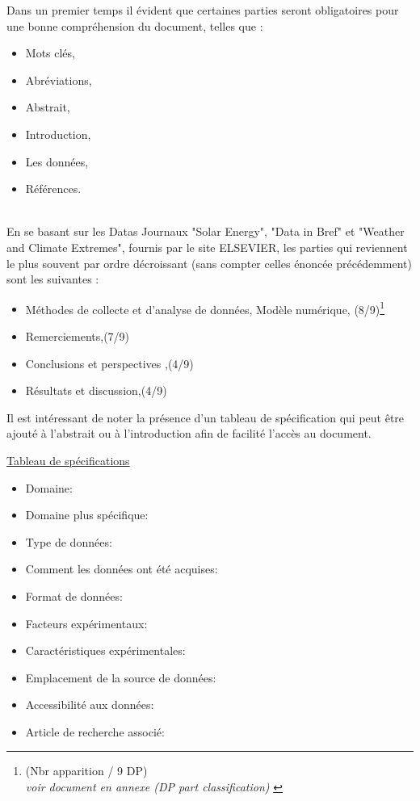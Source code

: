 \documentclass[11pt,oneside]{article}
\begin{document}
Dans un premier temps il évident que certaines parties seront obligatoires pour une bonne compréhension du document, telles que :\\
\begin{itemize}
\item Mots clés,
\item Abréviations,
\item Abstrait,
\item Introduction,
\item Les données,
\item Références.
\end{itemize}
\phantom{aaaaaaaaaaaaaaaaaaaaaaaaaaaaaaaaaaaaaaa
ytrfdytfugvghikuhjbiujbhaaaaaaaaaaaaaaa}\\
En se basant sur les Datas Journaux "Solar Energy", "Data in Bref" et "Weather and Climate Extremes", fournis par le site ELSEVIER, les parties qui reviennent le plus souvent par ordre décroissant (sans compter celles énoncée précédemment) sont les suivantes :\\
\begin{itemize}
\item Méthodes de collecte et d'analyse de données, Modèle numérique, (8/9)\footnote{(Nbr apparition / 9 DP)\\
{\small \textit{voir document en annexe (DP part classification) }}}
\item Remerciements,(7/9)
\item Conclusions et perspectives ,(4/9)
\item Résultats et discussion,(4/9)
\end{itemize}

Il est intéressant de noter la présence d'un tableau de spécification qui peut être ajouté à l'abstrait ou à l'introduction afin de facilité l'accès au document.

\underline {Tableau de spécifications}\\
\begin{itemize}
\item Domaine:
\item Domaine plus spécifique:
\item Type de données:
\item Comment les données ont été acquises:
\item Format de données:
\item Facteurs expérimentaux:
\item Caractéristiques expérimentales:
\item Emplacement de la source de données:
\item Accessibilité aux données:
\item Article de recherche associé:
\end{itemize}
\end{document}
